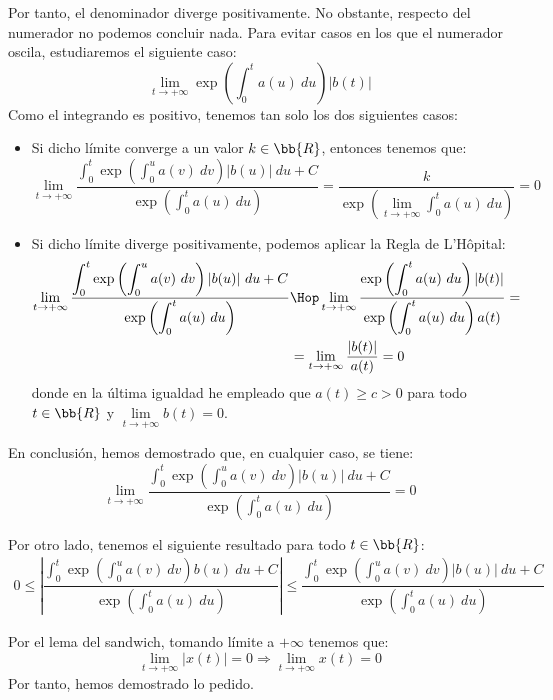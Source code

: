 \begin{ejercicio}
    Por tanto, el denominador diverge positivamente.
    No obstante, respecto del numerador no podemos concluir nada.
    Para evitar casos en los que el numerador oscila, estudiaremos el siguiente caso:
    \begin{equation*}
        \lim_{t\to +\infty} \exp\left(\int_0^t a(u)~du\right)|b(t)|
    \end{equation*}
    Como el integrando es positivo, tenemos tan solo los dos siguientes casos:
    \begin{itemize}
        \item Si dicho límite converge a un valor $k\in \bb{R}$, entonces tenemos que:
        \begin{equation*}
            \lim_{t\to +\infty} \dfrac{\displaystyle\int_0^t \exp\left(\int_0^u a(v)~dv\right)|b(u)|~du + C}{\displaystyle \exp\left(\int_0^t a(u)~du\right)}
            =\dfrac{k}{\exp\left(\lim\limits_{t\to +\infty}\displaystyle \int_0^t a(u)~du\right)} = 0
        \end{equation*}

        \item Si dicho límite diverge positivamente, podemos aplicar la Regla de L'Hôpital:
        \begin{align*}
            \lim_{t\to +\infty} \dfrac{\displaystyle\int_0^t \exp\left(\int_0^u a(v)~dv\right)|b(u)|~du + C}{\displaystyle \exp\left(\int_0^t a(u)~du\right)} &\Hop \lim_{t\to +\infty} \dfrac{\exp\left(\displaystyle\int_0^t a(u)~du\right)|b(t)|}{\exp\left(\displaystyle\int_0^t a(u)~du\right)a(t)} =\\&= \lim_{t\to +\infty} \dfrac{|b(t)|}{a(t)} = 0
        \end{align*}
        donde en la última igualdad he empleado que $a(t)\geq c>0$ para todo $t\in \bb{R}$ y $\lim\limits_{t \to +\infty} b(t) = 0$.
    \end{itemize}

    En conclusión, hemos demostrado que, en cualquier caso, se tiene:
    \begin{equation*}
        \lim_{t\to +\infty} \dfrac{\displaystyle\int_0^t \exp\left(\int_0^u a(v)~dv\right)|b(u)|~du + C}{\displaystyle \exp\left(\int_0^t a(u)~du\right)}=0
    \end{equation*}

    Por otro lado, tenemos el siguiente resultado para todo $t\in \bb{R}$:
    \begin{align*}
        0\leq \left|\dfrac{\displaystyle\int_0^t \exp\left(\int_0^u a(v)~dv\right)b(u)~du + C}{\displaystyle \exp\left(\int_0^t a(u)~du\right)}\right|
        \leq \dfrac{\displaystyle\int_0^t \exp\left(\int_0^u a(v)~dv\right)|b(u)|~du + C}{\displaystyle \exp\left(\int_0^t a(u)~du\right)}
    \end{align*}

    Por el lema del sandwich, tomando límite a $+\infty$ tenemos que:
    \begin{equation*}
        \lim_{t\to +\infty} |x(t)|=0 \Longrightarrow
        \lim_{t\to +\infty} x(t)=0
    \end{equation*}
    Por tanto, hemos demostrado lo pedido.
\end{ejercicio}

